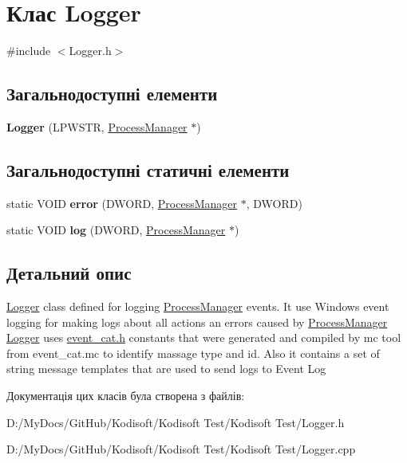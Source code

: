 \hypertarget{class_logger}{\section{Клас Logger}
\label{class_logger}
}


{\ttfamily \#include $<$Logger.\+h$>$}

\subsection*{Загальнодоступні елементи}
\begin{DoxyCompactItemize}
\item 
\hypertarget{class_logger_ad5976c5d766dc98681afeee715bfc9db}{{\bfseries Logger} (L\+P\+W\+S\+T\+R, \hyperlink{class_process_manager}{Process\+Manager} $\ast$)}\label{class_logger_ad5976c5d766dc98681afeee715bfc9db}

\end{DoxyCompactItemize}
\subsection*{Загальнодоступні статичні елементи}
\begin{DoxyCompactItemize}
\item 
\hypertarget{class_logger_a4a18f512e2d977a9bcb98af5d56db1d1}{static V\+O\+I\+D {\bfseries error} (D\+W\+O\+R\+D, \hyperlink{class_process_manager}{Process\+Manager} $\ast$, D\+W\+O\+R\+D)}\label{class_logger_a4a18f512e2d977a9bcb98af5d56db1d1}

\item 
\hypertarget{class_logger_ae246b48011da71bcd9f734a367e7646e}{static V\+O\+I\+D {\bfseries log} (D\+W\+O\+R\+D, \hyperlink{class_process_manager}{Process\+Manager} $\ast$)}\label{class_logger_ae246b48011da71bcd9f734a367e7646e}

\end{DoxyCompactItemize}


\subsection{Детальний опис}
\hyperlink{class_logger}{Logger} class defined for logging \hyperlink{class_process_manager}{Process\+Manager} events. It use Windows event logging for making logs about all actions an errors caused by \hyperlink{class_process_manager}{Process\+Manager} \hyperlink{class_logger}{Logger} uses \hyperlink{event__cat_8h_source}{event\+\_\+cat.\+h} constants that were generated and compiled by mc tool from event\+\_\+cat.\+mc to identify massage type and id. Also it contains a set of string message templates that are used to send logs to Event Log 

Документація цих класів була створена з файлів\+:\begin{DoxyCompactItemize}
\item 
D\+:/\+My\+Docs/\+Git\+Hub/\+Kodisoft/\+Kodisoft Test/\+Kodisoft Test/Logger.\+h\item 
D\+:/\+My\+Docs/\+Git\+Hub/\+Kodisoft/\+Kodisoft Test/\+Kodisoft Test/Logger.\+cpp\end{DoxyCompactItemize}

